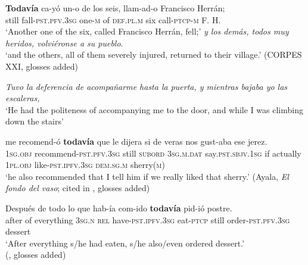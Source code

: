 \begin{exe}
	
	\ex\label{exAppendixSpanishTodaviaAdditive2}
	\gll \textbf{Todavía} ca-yó un-o de los seis, llam-ad-o {Francisco Herrán};\\	
	still fall-\textsc{pst}.\textsc{pfv}.3\textsc{sg} one-\textsc{m} of \textsc{def}.\textsc{pl}.\textsc{m} six call-\textsc{ptcp}-\textsc{m} {F. H.}\\
	\glt \lq Another one of the six, called Francisco Herrán, fell;\rq{}
	\exi{}  \textit{y los demás, todos muy heridos, volviéronse a su pueblo}.\\
	\lq and the others, all of them severely injured, returned to their village.\rq{ }(CORPES XXI, glosses added)

	\ex\label{exAppendixSpanishTodaviaAdditive4}	
	\textit{Tuvo la deferencia de acompañarme hasta la puerta, y mientras bajaba yo las escaleras,}
	\\ \lq He had the politeness of accompanying me to the door, and while I was climbing down the stairs\rq{}
	
	\gll me recomend-ó \textbf{todavía} que le dijera si {de veras} nos gust-aba ese jerez.\\
	1\textsc{sg}.\textsc{obj} recommend-\textsc{pst}.\textsc{pfv}.3\textsc{sg} still \textsc{subord} 3\textsc{sg}.\textsc{m}.\textsc{dat} say.\textsc{pst}.\textsc{sbjv}.1\textsc{sg} if actually 1\textsc{pl}.\textsc{obj} like-\textsc{pst}.\textsc{ipfv}.3\textsc{sg} \textsc{dem}.\textsc{sg}.\textsc{m} sherry(\textsc{m})\\
	\glt \lq  he also recommended that I tell him if we really liked that sherry.' (Ayala, \textit{El fondo del vaso}; cited in \cite[215]{Bosque2016}, glosses added)

	\ex\label{exAppendixSpanishTodaviaAdditive5}		
	\gll Después de todo lo que hab-ía com-ido \textbf{todavía} pid-ió postre.\\
	after of everything 3\textsc{sg}.\textsc{n} \textsc{rel} have-\textsc{pst}.\textsc{ipfv}.3\textsc{sg} eat-\textsc{ptcp} still order-\textsc{pst}.\textsc{pfv}.3\textsc{sg} dessert\\
	\glt \lq After everything s/he had eaten, s/he also/even ordered dessert.\rq{}
	\\(\cite[26]{Garrido1993}, glosses added)


\end{exe}
